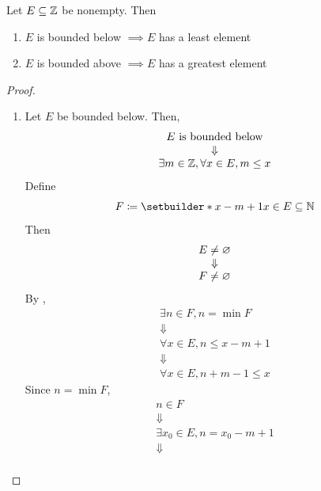 \bigskip

\begin{theorem} \label{an:thm:bounded-subset-of-Z-in-Z-has-extremum}
    Let $E \subseteq \mathbb{Z}$ be nonempty. Then
    \begin{enumerate}[label=\textbf{(\Alph*)}]
        \item $E$ is bounded below $\implies E$ has a least element
        \item $E$ is bounded above $\implies E$ has a greatest element
    \end{enumerate}
\end{theorem}

\begin{proof}
    \begin{enumerate}[label=\textbf{(\Alph*)}]
        \item Let $E$ be bounded below. Then,
        \[
        \begin{array}{c}
            E \text{ is bounded below} \\
            \Downarrow \\
            \exists m \in \mathbb{Z}, \forall x \in E, m \leq x
        \end{array}
        \]
        Define
        \[
        F \coloneqq \setbuilder*{x - m + 1}{x \in E} \subseteq \N
        \]
        Then
        \[
        \begin{array}{c}
            E \neq \varnothing \\
            \Downarrow \\
            F \neq \varnothing
        \end{array}
        \]
        By ,
        \[
        \begin{array}{c}
            \exists n \in F, n = \min F \\
            \Downarrow \\
            \forall x \in E, n \leq x - m + 1 \\
            \Downarrow \\
            \forall x \in E, n + m - 1 \leq x
        \end{array}
        \]
        Since $n = \min F$,
        \[
        \begin{array}{c}
            n \in F \\
            \Downarrow \\
            \exists x_{0} \in E, n = x_{0} - m + 1 \\
            \Downarrow \\

\end{array}\]
\end{enumerate}
\end{proof}
